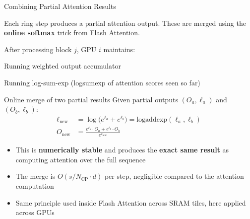 \begin{frame}{Combining Partial Attention Results}

  Each ring step produces a partial attention output.  These are merged using the \textbf{online softmax} trick from Flash Attention.

  \vspace{0.3em}
  After processing block $j$, GPU $i$ maintains:
  \begin{description}[labelwidth=1.2cm]
    \item[$O_i$] Running weighted output accumulator
    \item[$\ell_i$] Running log-sum-exp (logsumexp of attention scores seen so far)
  \end{description}

  \vspace{0.2em}
  \begin{block}{Online merge of two partial results}
    Given partial outputs $(O_a, \ell_a)$ and $(O_b, \ell_b)$:
    \begin{align*}
      \ell_{\text{new}} &= \log\bigl(e^{\ell_a} + e^{\ell_b}\bigr) = \text{logaddexp}(\ell_a, \ell_b) \\
      O_{\text{new}} &= \frac{e^{\ell_a} \cdot O_a + e^{\ell_b} \cdot O_b}{e^{\ell_{\text{new}}}}
    \end{align*}
  \end{block}

  \vspace{0.2em}
  {\small
  \begin{itemize}
    \item This is \textbf{numerically stable} and produces the \textbf{exact same result} as computing attention over the full sequence
    \item The merge is $O(s/N_{\text{CP}} \cdot d)$ per step, negligible compared to the attention computation
    \item Same principle used inside Flash Attention across SRAM tiles, here applied across GPUs
  \end{itemize}}
\end{frame}

